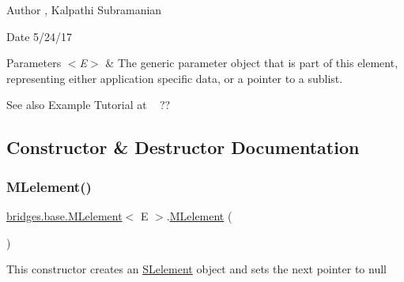 \begin{DoxyAuthor}{Author}
, Kalpathi Subramanian
\end{DoxyAuthor}
\begin{DoxyDate}{Date}
5/24/17
\end{DoxyDate}

\begin{DoxyParams}{Parameters}
{\em $<$\+E$>$} & The generic parameter object that is part of this element, representing either application specific data, or a pointer to a sublist.\\
\hline
\end{DoxyParams}
\begin{DoxySeeAlso}{See also}
Example Tutorial at ~\newline
 ?? 
\end{DoxySeeAlso}


\subsection{Constructor \& Destructor Documentation}
\mbox{\label{classbridges_1_1base_1_1_m_lelement_a721d1369c297dc3a3617a1476cb6f5f8}} 
\subsubsection{\texorpdfstring{M\+Lelement()}{MLelement()}\hspace{0.1cm}{\footnotesize\ttfamily [1/4]}}
{\footnotesize\ttfamily \mbox{\hyperlink{classbridges_1_1base_1_1_m_lelement}{bridges.\+base.\+M\+Lelement}}$<$ E $>$.\mbox{\hyperlink{classbridges_1_1base_1_1_m_lelement}{M\+Lelement}} (\begin{DoxyParamCaption}{ }\end{DoxyParamCaption})}

This constructor creates an \mbox{\hyperlink{classbridges_1_1base_1_1_s_lelement}{S\+Lelement}} object and sets the next pointer to null \mbox{\label{classbridges_1_1base_1_1_m_lelement_ad0437d26107039d98cdba6277cff19e2}} 
